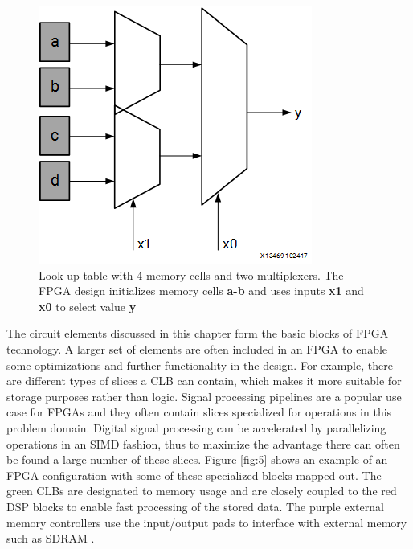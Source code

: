 \documentclass[12pt]{report}
\begin{document}
\begin{figure}[h]
    \centering
    \includegraphics[scale=0.5]{figures/lut.png}
    \caption{Look-up table with 4 memory cells and two multiplexers. The FPGA design initializes memory cells \textbf{a-b} and uses inputs \textbf{x1} and \textbf{x0} to select value \textbf{y} \citep{XilFPGAIntro}}
    \label{fig:4}
\end{figure}

The circuit elements discussed in this chapter form the basic blocks of FPGA technology. A larger set of elements are often included in an FPGA to enable some optimizations and further functionality in the design. For example, there are different types of slices a CLB can contain, which makes it more suitable for storage purposes rather than logic. Signal processing pipelines are a popular use case for FPGAs and they often contain slices specialized for operations in this problem domain. Digital signal processing can be accelerated by parallelizing operations in an SIMD fashion, thus to maximize the advantage there can often be found a large number of these slices. Figure \ref{fig:5} shows an example of an FPGA configuration with some of these specialized blocks mapped out. The green CLBs are designated to memory usage and are closely coupled to the red DSP blocks to enable fast processing of the stored data. The purple external memory controllers use the input/output pads to interface with external memory such as SDRAM \citep{XilFPGAIntro} \citep{XilClbMan}.
\end{document}
